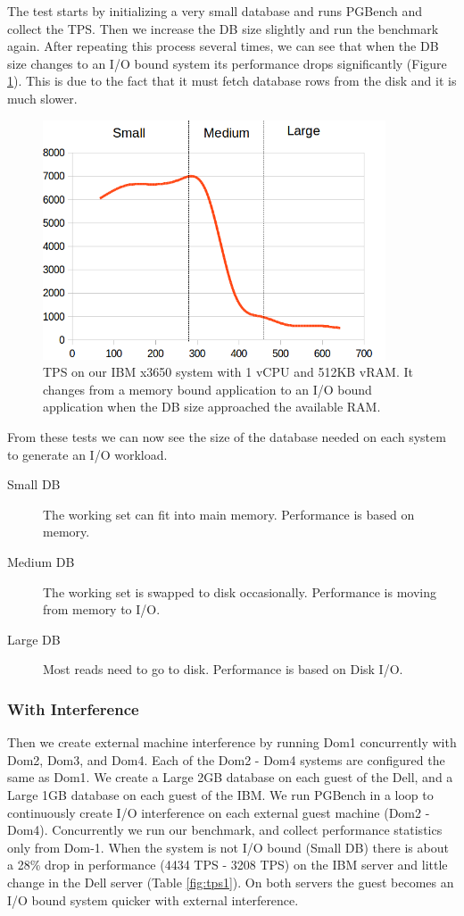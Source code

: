 The test starts by initializing a very small database and runs PGBench and collect the TPS.  
Then we increase the DB size slightly and run the benchmark again.  
After repeating this process several times, we can see that when the DB size changes to an I/O bound system its performance drops significantly (Figure \ref{smallIO}).  
This is due to the fact that it must fetch database rows from the disk and it is much slower.  

\begin{figure}[!h]
  \begin{center}
  \includegraphics[width=4in]{images/SmallScale.png}
  \caption{TPS on our IBM x3650 system with 1 vCPU and 512KB vRAM. It changes from a memory bound application to an I/O bound application when the DB size approached the available RAM.}
  \label{smallIO}
  \end{center}
\end{figure}

From these tests we can now see the size of the database needed on each system to generate an I/O workload. 
\begin{description}
  \item[Small DB] The working set can fit into main memory.  Performance is based on memory.
  \item[Medium DB] The working set is swapped to disk occasionally. Performance is moving from memory to I/O.
  \item[Large DB] Most reads need to go to disk.  Performance is based on Disk I/O.
\end{description}

\subsubsection{With Interference}
Then we create external machine interference by running Dom1 concurrently with Dom2, Dom3, and Dom4. Each of the Dom2 - Dom4 systems are configured the same as Dom1.  We create a Large 2GB database on each guest of the Dell, and a Large 1GB database on each guest of the IBM.  We run PGBench in a loop to continuously create I/O interference on each external guest machine (Dom2 - Dom4). Concurrently we run our benchmark, and collect performance statistics only from Dom-1.  When the system is not I/O bound (Small DB) there is about a 28\% drop in performance (4434 TPS - 3208 TPS) on the IBM server and little change in the Dell server (Table \ref{fig:tps1}).  On both servers the guest becomes an I/O bound system quicker with external interference.

